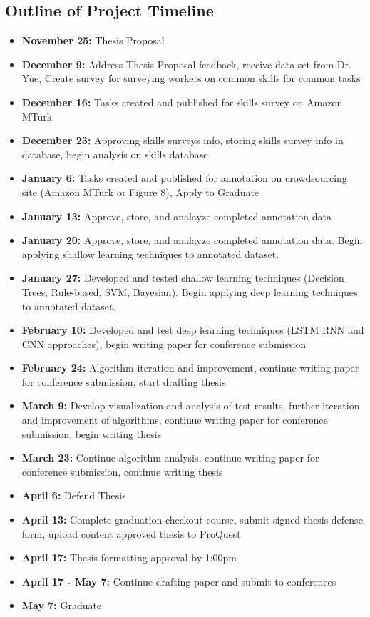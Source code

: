 \documentclass[letterpaper,12pt]{article}
\begin{document}
\subsection{Outline of Project Timeline}
\begin{itemize}
	\item \textbf{November 25:} Thesis Proposal
	\item \textbf{December 9:} Address Thesis Proposal feedback, receive data set from Dr. Yue, Create survey for surveying workers on common skills for common tasks
	\item \textbf{December 16:} Tasks created and published for skills survey on Amazon MTurk
	\item \textbf{December 23:} Approving skills surveys info, storing skills survey info in database, begin analysis on skills database
	\item \textbf{January 6:} Tasks created and published for annotation on crowdsourcing site (Amazon MTurk or Figure 8), Apply to Graduate
	\item \textbf{January 13:} Approve, store, and analayze completed annotation data
	\item \textbf{January 20:} Approve, store, and analayze completed annotation data. Begin applying shallow learning techniques to annotated dataset.
	\item \textbf{January 27:} Developed and tested shallow learning techniques (Decision Trees, Rule-based, SVM, Bayesian). Begin applying deep learning techniques to annotated dataset.
	\item \textbf{February 10:} Developed and test deep learning techniques (LSTM RNN and CNN approaches), begin writing paper for conference submission
	\item \textbf{February 24:} Algorithm iteration and improvement, continue writing paper for conference submission, start drafting thesis
	\item \textbf{March 9:} Develop visualization and analysis of test results, further iteration and improvement of algorithms, continue writing paper for conference submission, begin writing thesis
	\item \textbf{March 23:} Continue algorithm analysis, continue writing paper for conference submission, continue writing thesis
	\item \textbf{April 6:} Defend Thesis
	\item \textbf{April 13:} Complete graduation checkout course, submit signed thesis defense form, upload content approved thesis to ProQuest
	\item \textbf{April 17:} Thesis formatting approval by 1:00pm
	\item \textbf{April 17 - May 7:} Continue drafting paper and submit to conferences
	\item \textbf{May 7:} Graduate
\end{itemize}
\end{document}
